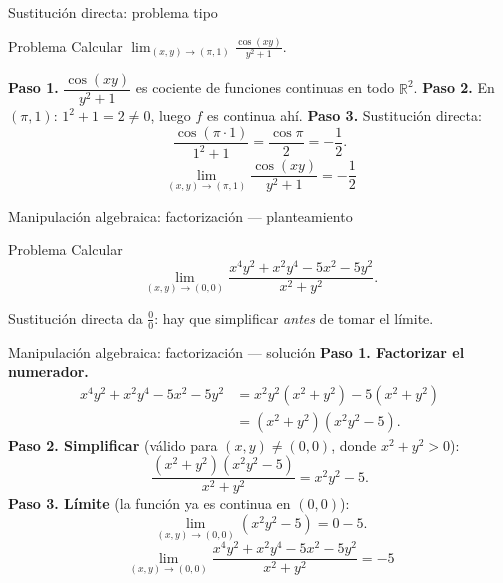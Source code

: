 \documentclass[11pt,aspectratio=169]{beamer}
\begin{document}
\begin{frame}{Sustitución directa: problema tipo}
  \begin{block}{Problema}
    Calcular $\displaystyle\lim_{(x,y)\to(\pi,1)}\frac{\cos(xy)}{y^2+1}$.
  \end{block}
  \pause
  \textbf{Paso 1.} $\dfrac{\cos(xy)}{y^2+1}$ es cociente de funciones continuas en todo $\mathbb R^2$.
  \pause
  \textbf{Paso 2.} En $(\pi,1)$: $1^2+1=2\neq 0$, luego $f$ es continua ahí.
  \pause
  \textbf{Paso 3.} Sustitución directa:
  \[
    \frac{\cos(\pi\cdot 1)}{1^2+1}=\frac{\cos\pi}{2}=-\frac12.
  \]
  \pause
  \[
    \boxed{\lim_{(x,y)\to(\pi,1)}\frac{\cos(xy)}{y^2+1}=-\frac12}
  \]
\end{frame}

\begin{frame}{Manipulación algebraica: factorización --- planteamiento}
  \begin{block}{Problema}
    Calcular
    \[
      \lim_{(x,y)\to(0,0)}\frac{x^4y^2+x^2y^4-5x^2-5y^2}{x^2+y^2}.
    \]
  \end{block}
  \pause
  \vspace{4pt}
  \begin{center}\normalsize\color{brick} Sustitución directa da $\tfrac00$: hay que simplificar \emph{antes} de tomar el límite.\end{center}
\end{frame}

\begin{frame}{Manipulación algebraica: factorización --- solución}
  \textbf{Paso 1. Factorizar el numerador.}
  \vspace{-4pt}
  \begin{align*}
    x^4y^2+x^2y^4-5x^2-5y^2
    &= x^2y^2(x^2+y^2)-5(x^2+y^2)\\
    &= (x^2+y^2)(x^2y^2-5).
  \end{align*}
  \pause
  \vspace{-8pt}
  \textbf{Paso 2. Simplificar} (válido para $(x,y)\neq(0,0)$, donde $x^2+y^2>0$):
  \[
    \frac{(x^2+y^2)(x^2y^2-5)}{x^2+y^2}=x^2y^2-5.
  \]
  \pause
  \vspace{-8pt}
  \textbf{Paso 3. Límite} (la función ya es continua en $(0,0)$):
  \[
    \lim_{(x,y)\to(0,0)}(x^2y^2-5)=0-5.
  \]
  \pause
  \vspace{-8pt}
  \[
    \boxed{\lim_{(x,y)\to(0,0)}\frac{x^4y^2+x^2y^4-5x^2-5y^2}{x^2+y^2}=-5}
  \]
\end{frame}
\end{document}

